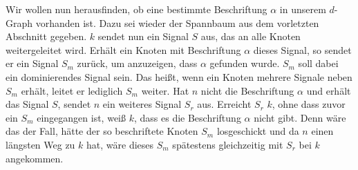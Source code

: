 \documentclass[11pt]{article}
\begin{document}
Wir wollen nun herausfinden, ob eine bestimmte Beschriftung $\alpha$ in unserem $d$-Graph vorhanden ist. Dazu sei wieder der Spannbaum aus dem vorletzten Abschnitt gegeben. $k$ sendet nun ein Signal $S$ aus, das an alle Knoten weitergeleitet wird. Erhält ein Knoten mit Beschriftung $\alpha$ dieses Signal, so sendet er ein Signal $S_m$ zurück, um anzuzeigen, dass $\alpha$ gefunden wurde. $S_m$ soll dabei ein dominierendes Signal sein. Das heißt, wenn ein Knoten mehrere Signale neben $S_m$ erhält, leitet er lediglich $S_m$ weiter. Hat $n$ nicht die Beschriftung $\alpha$ und erhält das Signal $S$, sendet $n$ ein weiteres Signal $S_r$ aus. Erreicht $S_r$ $k$, ohne dass zuvor ein $S_m$ eingegangen ist, weiß $k$, dass es die Beschriftung $\alpha$ nicht gibt. Denn wäre das der Fall, hätte der so beschriftete Knoten $S_m$ losgeschickt und da $n$ einen längsten Weg zu $k$ hat, wäre dieses $S_m$ spätestens gleichzeitig mit $S_r$ bei $k$ angekommen.
\end{document}
